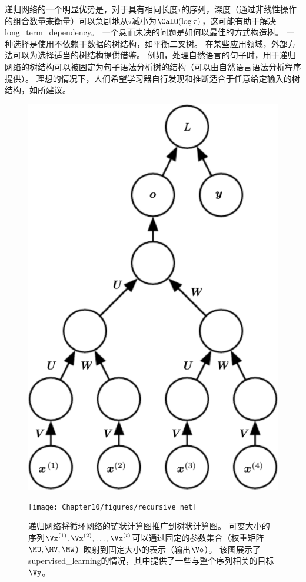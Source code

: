 
递归网络的一个明显优势是，对于具有相同长度$\tau$的序列，深度（通过非线性操作的组合数量来衡量）可以急剧地从$\tau$减小为$\CalO(\log \tau)$，这可能有助于解决\gls{long_term_dependency}。
一个悬而未决的问题是如何以最佳的方式构造树。
一种选择是使用不依赖于数据的树结构，如平衡二叉树。
在某些应用领域，外部方法可以为选择适当的树结构提供借鉴。
例如，处理自然语言的句子时，用于递归网络的树结构可以被固定为句子语法分析树的结构（可以由自然语言语法分析程序提供）\citep{Socher+al-NIPS2011,Socher-et-al-EMNLP2013}。
理想的情况下，人们希望学习器自行发现和推断适合于任意给定输入的树结构，如\citep{bottou_machine_2014}所建议。


\begin{figure}[!htb]
\ifOpenSource
\centerline{\includegraphics[scale=0.5]{images/102.png}}
\else
\centerline{\texttt{[image: Chapter10/figures/recursive\_net]}}
\fi
\caption{递归网络将循环网络的链状计算图推广到树状计算图。
可变大小的序列$\Vx^{(1)},\Vx^{(2)},\dots,\Vx^{(t)}$可以通过固定的参数集合（权重矩阵$\MU,\MV,\MW$）映射到固定大小的表示（输出$\Vo$）。
该图展示了\gls{supervised_learning}的情况，其中提供了一些与整个序列相关的目标$\Vy$。
}
\label{fig:chap10_recursive_net}
\end{figure}

